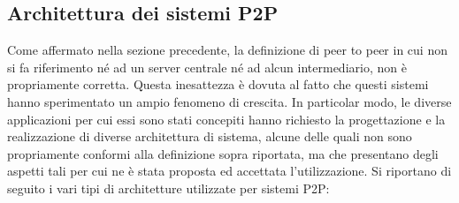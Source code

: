 \subsection{Architettura dei sistemi P2P}
Come affermato nella sezione precedente, la definizione di peer to peer in cui non si fa riferimento né ad un server centrale né ad alcun intermediario, non è propriamente corretta. Questa inesattezza è dovuta al fatto che questi sistemi hanno sperimentato un ampio fenomeno di crescita. In particolar modo, le diverse applicazioni per cui essi sono stati concepiti hanno richiesto la progettazione e la realizzazione di diverse architettura di sistema, alcune delle quali non sono propriamente conformi alla definizione sopra riportata, ma che presentano degli aspetti tali per cui ne è stata proposta ed accettata l’utilizzazione.
Si riportano di seguito i vari tipi di architetture utilizzate per sistemi P2P:
